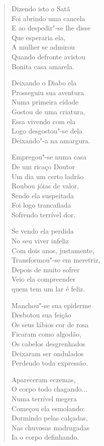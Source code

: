 \begin{verse}
Dizendo isto o Satã \\
Foi abrindo uma cancela \\
E ao despedir"-se lhe disse \\
Que esperaria ela, \\
A mulher se admirou \\
Quando defronte avistou \\
Bonita casa amarela. 


Deixando o Diabo ela \\
Prosseguiu sua aventura \\
Numa primeira cidade \\
Gostou de uma criatura, \\
Essa vivendo com ela \\
Logo desgostou"-se dela \\
Deixando"-a na amargura. 

Empregou"-se numa casa \\
De um ricaço Doutor \\
Um dia um certo ladrão \\
Roubou jóias de valor, \\
Sendo ela suspeitada \\
Foi logo trancafiada \\
Sofrendo terrível dor. 

Se vendo ela perdida \\
No seu viver infeliz \\
Com dois anos, justamente, \\
Transformou"-se em meretriz, \\
Depois de muito sofrer \\
Veio ela compreender \\
quem tem um lar é feliz. 

Manchou"-se sua epiderme \\
Desbotou sua feição \\
Os seus lábios cor de rosa \\
Ficaram como algodão, \\
Os cabelos desgrenhados \\
Deixaram ser ondulados \\
Perdendo toda expressão. 


Apareceram eczemas, \\
O corpo todo chagando... \\
Numa terrível megera \\
Começou ela esmolando: \\
Dormindo pelas calçadas, \\
Nas chuvosas madrugadas \\
Ia o corpo definhando. 


\end{verse}
